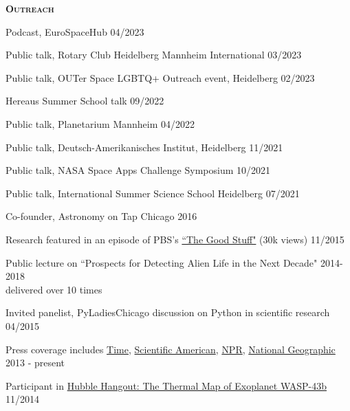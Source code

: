 \documentclass[12pt,letterpaper]{article}
\begin{document}
\textbf{\textsc{Outreach}} 
\begin{compactitem}[]
\item Podcast, EuroSpaceHub \hfill 04/2023
\item Public talk, Rotary Club Heidelberg Mannheim International \hfill 03/2023
\item Public talk, OUTer Space LGBTQ+ Outreach event, Heidelberg \hfill 02/2023
\item Hereaus Summer School talk \hfill 09/2022
\item Public talk, Planetarium Mannheim \hfill 04/2022
\item Public talk, Deutsch-Amerikanisches Institut, Heidelberg \hfill 11/2021
\item Public talk, NASA Space Apps Challenge Symposium \hfill 10/2021
\item Public talk, International Summer Science School Heidelberg \hfill 07/2021
\item Co-founder, Astronomy on Tap Chicago \hfill 2016
\item Research featured in an episode of PBS's \href{https://www.youtube.com/watch?v=i4Hrmh6LJ0Q&index=2&list=PLsRLUurFnvvXTEbTjA1tvHhWmh6aKTgDw}{``The Good Stuff"} (30k views) \hfill 11/2015
\item Public lecture on ``Prospects for Detecting Alien Life in the Next Decade" \hfill 2014-2018 \\
\hspace*{5 mm}delivered over 10 times
\item Invited panelist, PyLadiesChicago discussion on Python in scientific research \hfill 04/2015
\item Press coverage includes \href{http://science.time.com/2013/12/31/the-real-space-oddities-super-earths-and-jumbo-neptunes/}{Time}, \href{http://www.nature.com/scientificamerican/journal/v23/n3s/full/scientificamericanuniverse0814-4.html}{Scientific American}, \href{http://www.npr.org/2014/01/02/259222620/on-planet-gj1214-b-expect-exotic-cloud-cover}{NPR}, \href{http://news.nationalgeographic.com/news/2014/10/141014-space-hubble-planet-weather-science/?utm_source=Twitter&utm_medium=Social&utm_content=link_tw20141014news-hubbletele&utm_campaign=Content&sf5218387=1}{National Geographic} \hfill 2013 - present
\item Participant in \href{https://www.youtube.com/watch?v=n-oDqYCf3XY}{Hubble Hangout: The Thermal Map of Exoplanet WASP-43b} \hfill 11/2014

\end{compactitem}
\end{document}
